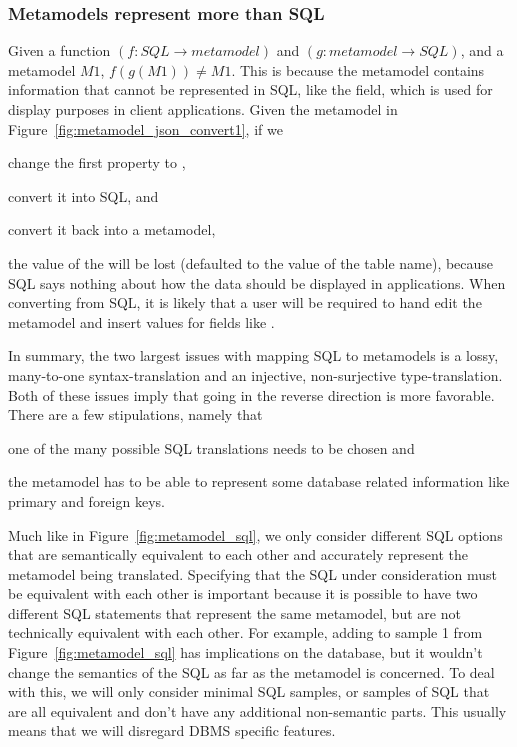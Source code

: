 \subsubsection{Metamodels represent more than SQL}  \label{sec:}


Given a function $(f:SQL \rightarrow metamodel)$ and \mbox{$(g:metamodel
\rightarrow SQL)$}, and a metamodel $M1$, $f(g(M1)) \neq M1$.
This is because the metamodel contains information that cannot be
represented in SQL, like the  field, which is used for display
purposes in client applications. Given the metamodel in
Figure~\ref{fig:metamodel_json_convert1}, if we
\begin{inparaenum}
\item change the first  property to ,
\item convert it into SQL, and
\item convert it back into a metamodel,
\end{inparaenum}
the value of the  will be lost (defaulted to the value of the table
name), because SQL says nothing about how the data should be displayed in
applications. When converting from SQL, it is likely that a
user will be required to hand edit the metamodel and insert values for fields
like .

In summary, the two largest issues with mapping SQL to metamodels is a lossy,
many-to-one syntax-translation and an injective, non-surjective type-translation.
Both of these issues imply that going in the reverse direction is more
favorable. There are a few stipulations, namely that 
\begin{inparaenum} 
\item one of the many possible SQL translations needs to be chosen and
\item the metamodel has to be able to represent some database related information
like primary and foreign keys.
\end{inparaenum}

Much like in Figure~\ref{fig:metamodel_sql}, we only consider different SQL
options that are semantically equivalent to each other and accurately represent
the metamodel being translated. Specifying that the SQL under consideration must
be equivalent with each other is important because it is possible to have two
different SQL statements that represent the same metamodel, but are not
technically equivalent with each other. For example, adding 
to sample 1 from Figure~\ref{fig:metamodel_sql} has implications on the
database, but it wouldn't change the semantics of the SQL as far as the
metamodel is concerned. To deal with this, we will only consider minimal SQL
samples, or samples of SQL that are all equivalent and don't have any additional
non-semantic parts. This usually means that we will disregard DBMS specific
features.


